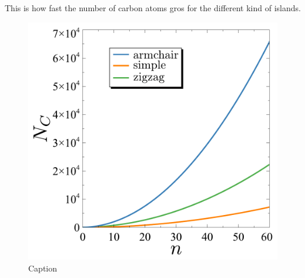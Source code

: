 This is how fast the number of carbon atoms gros for the different kind of islands.

\begin{figure}[h!]
\centering
\includegraphics{appendix/figures/Nats.pdf}
\vspace{-5pt}
\caption{Caption}
\label{Label}
\end{figure}
\FloatBarrier
